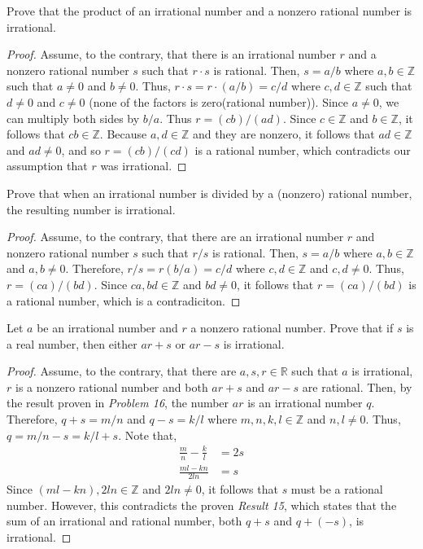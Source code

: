 \documentclass[12pt]{article}
\newcommand{\Z}{\mathbb{Z}}
\newcommand{\R}{\mathbb{R}}
\newenvironment{problem}[2][Problem]{\begin{trivlist}
		\item[\hskip \labelsep {\bfseries #1}\hskip \labelsep {\bfseries #2.}]}{\end{trivlist}}
\begin{document}
	\begin{problem}{16}
		Prove that the product of an irrational number and a nonzero rational number is irrational.
		\begin{proof}
			Assume, to the contrary, that there is an irrational number $r$ and a nonzero rational number $s$ such that $r\cdot s$ is rational. Then, $s=a/b$ where $a,b\in \Z$ such that $a\neq 0$ and $b\neq 0$. Thus, $r\cdot s = r\cdot (a/b) = c/d$ where $c,d\in \Z$ such that $d\neq 0$ and $c\neq 0$ (none of the factors is zero(rational number)). Since $a\neq 0$, we can multiply both sides by $b/a$. Thus $r = (cb)/(ad)$. Since $c\in \Z$ and $b\in \Z$, it follows that $cb\in \Z$. Because $a,d\in \Z$ and they are nonzero, it follows that $ad\in \Z$ and $ad\neq 0$, and so $r = (cb)/(cd)$ is a rational number, which contradicts our assumption that $r$ was irrational.
		\end{proof}
	\end{problem}

	\begin{problem}{17}
		Prove that when an irrational number is divided by a (nonzero) rational number, the resulting number is irrational.
		\begin{proof}
			Assume, to the contrary, that there are an irrational number $r$ and nonzero rational number $s$ such that $r/s$ is rational. Then, $s = a/b$ where $a,b\in \Z$ and $a,b\neq 0$. Therefore, $r/s = r(b/a) = c/d$ where $c,d\in \Z$ and $c,d\neq 0$. Thus, $r = (ca)/(bd)$. Since $ca,bd\in \Z$ and $bd\neq 0$, it follows that $r=(ca)/(bd)$ is a rational number, which is a contradiciton. 
		\end{proof}
	\end{problem}

	\begin{problem}{18}
		Let $a$ be an irrational number and $r$ a nonzero rational number. Prove that if $s$ is a real number, then either $ar+s$ or $ar-s$ is irrational.
		\begin{proof}
			Assume, to the contrary, that there are $a,s,r\in \R$ such that $a$ is irrational, $r$ is a nonzero rational number and both $ar+s$ and $ar-s$ are rational. Then, by the result proven in \textit{Problem 16}, the number $ar$ is an irrational number $q$. Therefore, $q+s = m/n$ and $q-s = k/l$ where $m,n,k,l \in \Z$ and $n,l\neq 0$. Thus, $q = m/n - s = k/l + s$. Note that,
			\begin{align*}
				\frac{m}{n}-\frac{k}{l} &= 2s\\
				\frac{ml-kn}{2ln} &= s 
			\end{align*}
			Since $(ml-kn),2ln\in \Z$ and $2ln \neq 0$, it follows that $s$ must be a rational number. However, this contradicts the proven \textit{Result 15}, which states that the sum of an irrational and rational number, both $q+s$ and $q+(-s)$, is irrational. 
		\end{proof}
	\end{problem}
 
\end{document}
